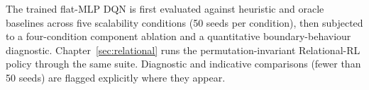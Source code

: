 The trained flat-MLP DQN is first evaluated against heuristic and oracle baselines across five
scalability conditions (50 seeds per condition), then subjected to a four-condition component
ablation and a quantitative boundary-behaviour diagnostic. Chapter~\ref{sec:relational} runs
the permutation-invariant Relational-RL policy through the same suite. Diagnostic and
indicative comparisons (fewer than 50 seeds) are flagged explicitly where they appear.

